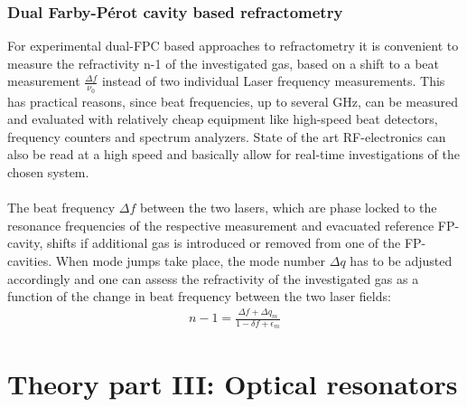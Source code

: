 \subsection{Dual Farby-Pérot cavity based refractometry}
For experimental dual-FPC based approaches to refractometry it is convenient to measure the refractivity n-1 of the investigated gas, based on a shift to a beat measurement $\frac{\Delta f}{\nu_0}$ instead of two individual Laser frequency measurements. This has practical reasons, since beat frequencies, up to several GHz, can be measured and evaluated with relatively cheap equipment like high-speed beat detectors, frequency counters and spectrum analyzers. State of the art RF-electronics can also be read at a high speed and basically allow for real-time investigations of the chosen system.\\\\
The beat frequency $\Delta f$ between the two lasers, which are phase locked to the resonance frequencies of the respective measurement and evacuated reference FP-cavity, shifts if additional gas is introduced or removed from one of the FP-cavities. When mode jumps take place, the mode number $\Delta q$ has to be adjusted accordingly and one can
assess the refractivity of the investigated gas as a function of the change in beat frequency between the two laser fields:
\begin{align}
	n-1=\frac{\Delta f +\Delta q_m}{1-\delta f +\epsilon_m}
	\label{eg:}
\end{align}
\chapter{Theory part III: Optical resonators}

